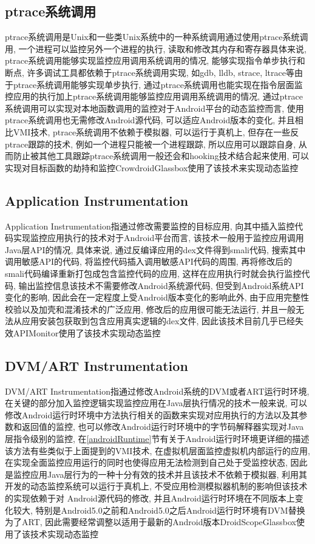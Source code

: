 \subsection{ptrace系统调用}
ptrace系统调用是Unix和一些类Unix系统中的一种系统调用\juhao 通过使用ptrace系统调用, 一个进程可以监控另外一个进程的执行, 读取和修改其内存和寄存器\juhao 具体来说, ptrace系统调用能够实现监控应用调用系统调用的情况, 能够实现指令单步执行和断点, 许多调试工具都依赖于ptrace系统调用实现, 如gdb, lldb, strace, ltrace等\juhao 由于ptrace系统调用能够实现单步执行, 通过ptrace系统调用也能实现在指令层面监控应用的执行\juhao 加上ptrace系统调用能够监控应用调用系统调用的情况, 通过ptrace系统调用可以实现对本地函数调用的监控\juhao 对于Android平台的动态监控而言, 使用ptrace系统调用也无需修改Android源代码, 可以适应Android版本的变化, 并且相比VMI技术, ptrace系统调用不依赖于模拟器, 可以运行于真机上, 但存在一些反ptrace跟踪的技术, 例如一个进程只能被一个进程跟踪, 所以应用可以跟踪自身, 从而防止被其他工具跟踪\juhao ptrace系统调用一般还会和hooking技术结合起来使用, 可以实现对目标函数的劫持和监控\juhao Crowdroid\dunhao Glassbox使用了该技术来实现动态监控\juhao

\subsection{Application Instrumentation}
Application Instrumentation指通过修改需要监控的目标应用, 向其中插入监控代码实现监控应用执行的技术\juhao 对于Android平台而言, 该技术一般用于监控应用调用Java层API的情况, 具体来说, 通过反编译应用的dex文件得到smali代码, 搜索其中调用敏感API的代码, 将监控代码插入调用敏感API代码的周围, 再将修改后的smali代码编译重新打包成包含监控代码的应用, 这样在应用执行时就会执行监控代码, 输出监控信息\juhao 该技术不需要修改Android系统源代码, 但受到Android系统API变化的影响, 因此会在一定程度上受Android版本变化的影响\juhao 此外, 由于应用完整性校验以及加壳和混淆技术的广泛应用, 修改后的应用很可能无法运行, 并且一般无法从应用安装包获取到包含应用真实逻辑的dex文件, 因此该技术目前几乎已经失效\juhao APIMonitor使用了该技术实现动态监控\juhao

\subsection{DVM/ART Instrumentation}
\label{artInstr}
DVM/ART Instrumentation指通过修改Android系统的DVM或者ART运行时环境, 在关键的部分加入监控逻辑实现监控应用在Java层执行情况的技术\juhao 一般来说, 可以修改Android运行时环境中方法执行相关的函数来实现对应用执行的方法以及其参数和返回值的监控, 也可以修改Android运行时环境中的字节码解释器实现对Java层指令级别的监控, 在\ref{androidRuntime}节有关于Android运行时环境更详细的描述\juhao 该方法有些类似于上面提到的VMI技术, 在虚拟机层面监控虚拟机内部运行的应用, 在实现全面监控应用运行的同时也使得应用无法检测到自己处于受监控状态, 因此是监控应用Java层行为的一种十分有效的技术\juhao 并且该技术不依赖于模拟器, 利用其开发的动态监控系统可以运行于真机上, 不受应用检测模拟器机制的影响\juhao 但该技术的实现依赖于对
Android源代码的修改, 并且Android运行时环境在不同版本上变化较大, 特别是Android5.0之前和Android5.0之后Android运行时环境有DVM替换为了ART, 因此需要经常调整以适用于最新的Android版本\juhao DroidScope\dunhao Glassbox使用了该技术实现动态监控\juhao

